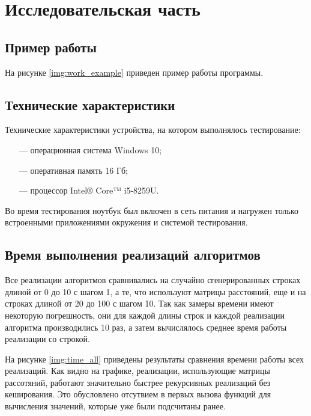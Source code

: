 \chapter{Исследовательская часть}

\section{Пример работы}

На рисунке \ref{img:work_example} приведен пример работы программы.


\section{Технические характеристики}

Технические характеристики устройства, на котором выполнялось тестирование:

\begin{itemize}
	\item[---] операционная система Windows 10;
	\item[---] оперативная память 16 Гб;
	\item[---] процессор Intel® Core™ i5-8259U.
\end{itemize}

Во время тестирования ноутбук был включен в сеть питания и нагружен только встроенными приложениями окружения и системой тестирования.

\section{Время выполнения реализаций алгоритмов}

 Все реализации алгоритмов сравнивались на случайно сгенерированных строках длиной от 0 до 10 с шагом 1, а те, что используют матрицы расстояний, еще и на строках длиной от 20 до 100 с шагом 10. Так как замеры времени имеют некоторую погрешность, они для каждой длины строк и каждой реализации алгоритма производились 10 раз, а затем вычислялось среднее время работы реализации со строкой.
 
На рисунке \ref{img:time_all} приведены результаты сравнения времени работы всех реализаций. Как видно на графике, реализации, использующие матрицы рассотяний, работают значительно быстрее рекурсивных реализаций без кеширования. Это обусловлено отсутвием в первых вызова функций для вычисления значений, которые уже были подсчитаны ранее.
\newpage
{}

